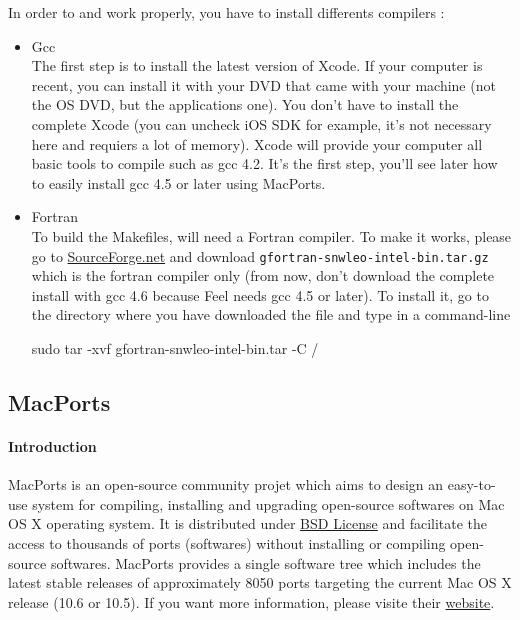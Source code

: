 In order to \feel and \cmake work properly, you have to install differents compilers :
\begin{itemize}
\item Gcc \\
  The first step is to install the latest version of Xcode. If your computer is
  recent, you can install it with your DVD that came with your machine (not the
  OS DVD, but the applications one). You don't have to install the complete
  Xcode (you can uncheck iOS SDK for example, it's not necessary here and
  requiers a lot of memory). Xcode will provide your computer all basic tools to
  compile such as gcc 4.2. It's the first step, you'll see later how to easily
  install gcc 4.5 or later using MacPorts.
\item Fortran \\
  To build the Makefiles, \cmake will need a Fortran compiler. To make it works,
  please go to \href{http://hpc.sourceforge.net/}{SourceForge.net} and download
  \lstinline|gfortran-snwleo-intel-bin.tar.gz| which is the fortran compiler
  only (from now, don't download the complete install with gcc 4.6 because Feel
  needs gcc 4.5 or later). To install it, go to the directory where you have
  downloaded the file and type in a command-line
\begin{unixcom}
		sudo tar -xvf gfortran-snwleo-intel-bin.tar -C /
\end{unixcom}

\end{itemize}

\subsection{MacPorts}

\paragraph{Introduction}
MacPorts is an open-source community projet which aims to design an easy-to-use
system for compiling, installing and upgrading open-source softwares on Mac OS X
operating system. It is distributed under
\href{http://opensource.org/licenses/bsd-license.php}{BSD License} and
facilitate the access to thousands of ports (softwares) without installing or
compiling open-source softwares.  MacPorts provides a single software tree which
includes the latest stable releases of approximately 8050 ports targeting the
current Mac OS X release (10.6 or 10.5). If you want more information, please
visite their \href{http://www.macports.org/}{website}.

